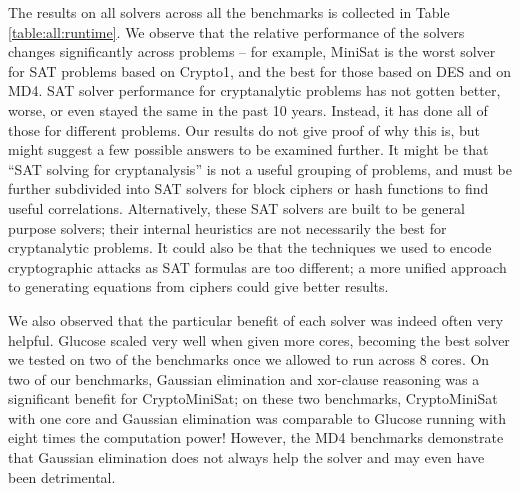 The results on all solvers across all the benchmarks is collected in Table \ref{table:all:runtime}. We observe that the relative performance of the solvers changes significantly across problems -- for example, MiniSat is the worst solver for SAT problems based on Crypto1, and the best for those based on DES and on MD4. SAT solver performance for cryptanalytic problems has not gotten better, worse, or even stayed the same in the past 10 years. Instead, it has done all of those for different problems. Our results do not give proof of why this is, but might suggest a few possible answers to be examined further. It might be that ``SAT solving for cryptanalysis'' is not a useful grouping of problems, and must be further subdivided into SAT solvers for block ciphers or hash functions to find useful correlations. Alternatively, these SAT solvers are built to be general purpose solvers; their internal heuristics are not necessarily the best for cryptanalytic problems. It could also be that the techniques we used to encode cryptographic attacks as SAT formulas are too different; a more unified approach to generating equations from ciphers could give better results.

We also observed that the particular benefit of each solver was indeed often very helpful. Glucose scaled very well when given more cores, becoming the best solver we tested on two of the benchmarks once we allowed to run across 8 cores. On two of our benchmarks, Gaussian elimination and xor-clause reasoning was a significant benefit for CryptoMiniSat; on these two benchmarks, CryptoMiniSat with one core and Gaussian elimination was comparable to Glucose running with eight times the computation power! However, the MD4 benchmarks demonstrate that Gaussian elimination does not always help the solver and may even have been detrimental.